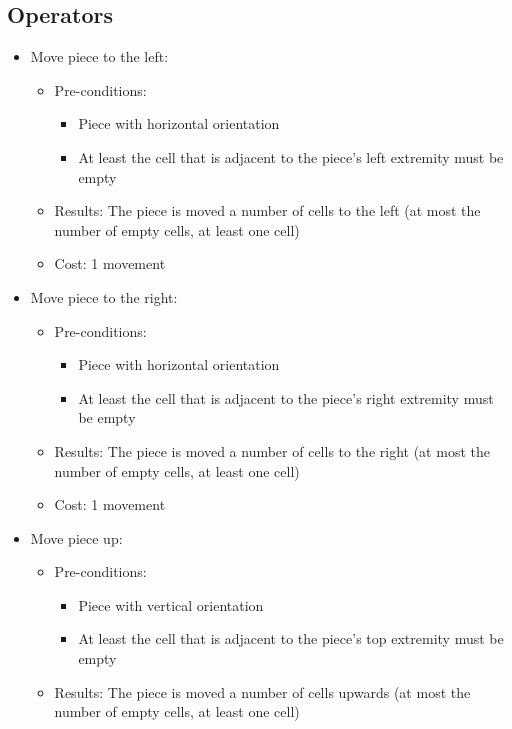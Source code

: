 \documentclass[conference]{IEEEtran}
\begin{document}
\subsection{Operators} \label{subsec:op}
\begin{itemize}
    \item Move piece to the left:
    \begin{itemize}
        \item Pre-conditions:
        \begin{itemize}
            \item Piece with horizontal orientation
            \item At least the cell that is adjacent to the piece's left extremity must be empty
        \end{itemize}
        \item Results: The piece is moved a number of cells to the left (at most the number of empty cells, at least one cell)
        \item Cost: 1 movement
    \end{itemize}
    \item Move piece to the right:
    \begin{itemize}
        \item Pre-conditions:
        \begin{itemize}
            \item Piece with horizontal orientation
            \item At least the cell that is adjacent to the piece's right extremity must be empty
        \end{itemize}
        \item Results: The piece is moved a number of cells to the right (at most the number of empty cells, at least one cell)
        \item Cost: 1 movement
    \end{itemize}
    \item Move piece up:
        \begin{itemize}
        \item Pre-conditions:
        \begin{itemize}
            \item Piece with vertical orientation
            \item At least the cell that is adjacent to the piece's top extremity must be empty
        \end{itemize}
        \item Results: The piece is moved a number of cells upwards (at most the number of empty cells, at least one cell)

\end{itemize}
\end{itemize}
\end{document}
